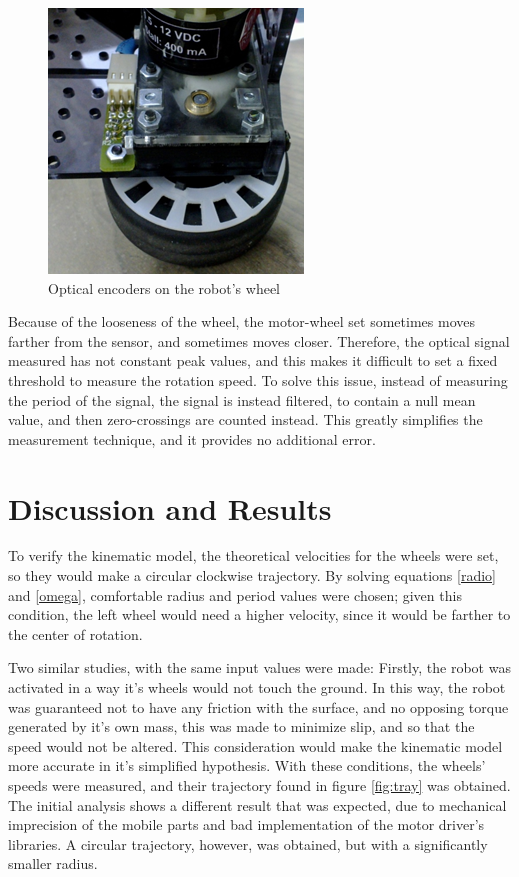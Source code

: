 \documentclass[a4paper]{aadeca}
\begin{document}
\begin{figure}[h]
\centering
\includegraphics[width=0.6\linewidth]{./encoder}
\caption{Optical encoders on the robot's wheel}
\label{fig:encoder}
\end{figure}

Because of the looseness of the wheel, the motor-wheel set sometimes moves farther from the sensor, and sometimes moves closer.
Therefore, the optical signal measured has not constant peak values, and this makes it difficult to set a fixed threshold to measure the rotation speed.
To solve this issue, instead of measuring the period of the signal, the signal is instead filtered, to contain a null mean value, and then zero-crossings are counted instead.
This greatly simplifies the measurement technique, and it provides no additional error.

\section{Discussion and Results}

To verify the kinematic model, the theoretical velocities for the wheels were set, so they would make a circular clockwise trajectory.
By solving equations \ref{radio} and \ref{omega}, comfortable radius and period values were chosen; given this condition, the left wheel would need a higher velocity, since it would be farther to the center of rotation.

Two similar studies, with the same input values were made:
Firstly, the robot was activated in a way it's wheels would not touch the ground.
In this way, the robot was guaranteed not to have any friction with the surface, and no opposing torque generated by it's own mass, this was made to minimize slip, and so that the speed would not be altered.
This consideration would make the kinematic model more accurate in it's simplified hypothesis.
With these conditions, the wheels' speeds were measured, and their trajectory found in figure \ref{fig:tray} was obtained.
The initial analysis shows a different result that was expected, due to mechanical imprecision of the mobile parts and bad implementation of the motor driver's libraries.
A circular trajectory, however, was obtained, but with a significantly smaller radius.
\end{document}
